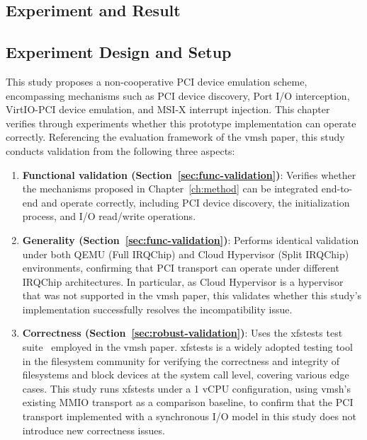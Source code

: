 \begin{ZhChapter}

\chapter{Experiment and Result}
\label{ch:experiment}

\section{Experiment Design and Setup}
\label{sec:exp-setup}

This study proposes a non-cooperative PCI device emulation scheme, encompassing mechanisms such as PCI device discovery, Port I/O interception, VirtIO-PCI device emulation, and MSI-X interrupt injection. This chapter verifies through experiments whether this prototype implementation can operate correctly. Referencing the evaluation framework of the vmsh paper, this study conducts validation from the following three aspects:

\begin{enumerate}
    \item \textbf{Functional validation (Section~\ref{sec:func-validation})}: Verifies whether the mechanisms proposed in Chapter~\ref{ch:method} can be integrated end-to-end and operate correctly, including PCI device discovery, the initialization process, and I/O read/write operations.

    \item \textbf{Generality (Section~\ref{sec:func-validation})}: Performs identical validation under both QEMU (Full IRQChip) and Cloud Hypervisor (Split IRQChip) environments, confirming that PCI transport can operate under different IRQChip architectures. In particular, as Cloud Hypervisor is a hypervisor that was not supported in the vmsh paper, this validates whether this study's implementation successfully resolves the incompatibility issue.

    \item \textbf{Correctness (Section~\ref{sec:robust-validation})}: Uses the xfstests test suite~\cite{Xfstests} employed in the vmsh paper. xfstests is a widely adopted testing tool in the filesystem community for verifying the correctness and integrity of filesystems and block devices at the system call level, covering various edge cases. This study runs xfstests under a 1 vCPU configuration, using vmsh's existing MMIO transport as a comparison baseline, to confirm that the PCI transport implemented with a synchronous I/O model in this study does not introduce new correctness issues.
\end{enumerate}


\end{ZhChapter}

